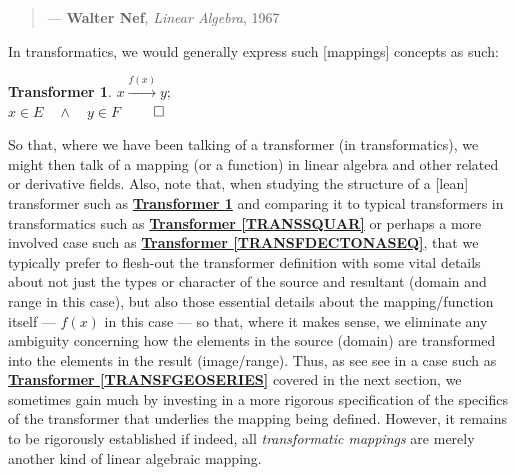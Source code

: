 \documentclass[a4paper, 18pt]{book} %
\newtheorem{transf}{Transformer}
\begin{document}
\begin{appendices}
\vspace{2em}

\noindent
\begin{minipage}{1\textwidth}
\vspace{1em}
\begin{quotation}
\hspace*{\fill} --- \textbf{Walter Nef}, \textit{Linear Algebra}, 1967\cite{nef1967linear}
\end{quotation}
\vspace{1em}
\end{minipage}

\vspace{2em}


In transformatics, we would generally express such [mappings] concepts as such:

\vspace{2em}



\begin{transf}
\label{TRANSFMAPPINGS}
$ x \xrightarrow{f(x)} y;$\\
$ x \in E \quad \land \quad y \in F$
$\qed$
\end{transf}

\vspace{2em}

So that, where we have been talking of a transformer (in transformatics), we might then talk of a mapping (or a function) in linear algebra and other related or derivative fields. Also, note that, when studying the structure of a [lean] transformer such as \textbf{\hyperref[TRANSFMAPPINGS]{Transformer \ref{TRANSFMAPPINGS}}} and comparing it to typical transformers in transformatics such as \textbf{\hyperref[TRANSSQUAR]{Transformer \ref{TRANSSQUAR}}} or perhaps a more involved case such as \textbf{\hyperref[TRANSFDECTONASEQ]{Transformer \ref{TRANSFDECTONASEQ}}}, that we typically prefer to flesh-out the transformer definition with some vital details about not just the types or character of the source and resultant (domain and range in this case), but also those essential details about the mapping/function itself --- $f(x)$ in this case --- so that, where it makes sense, we eliminate any ambiguity concerning how the elements in the source (domain) are transformed into the elements in the result (image/range). Thus, as see see in a case such as \textbf{\hyperref[TRANSFGEOSERIES]{Transformer \ref{TRANSFGEOSERIES}}} covered in the next section, we sometimes gain much by investing in a more rigorous specification of the specifics of the transformer that underlies the mapping being defined. However, it remains to be rigorously established if indeed, all \textit{transformatic mappings} are merely another kind of linear algebraic mapping.




\end{appendices}
\end{document}

